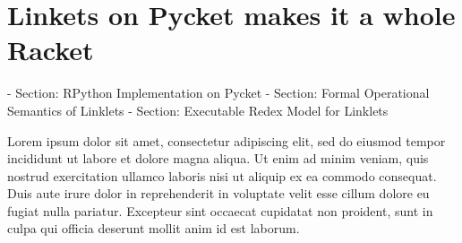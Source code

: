 \chapter{Linkets on Pycket makes it a whole Racket}
	- Section: RPython Implementation on Pycket
	- Section: Formal Operational Semantics of Linklets
	- Section: Executable Redex Model for Linklets
	
Lorem ipsum dolor sit amet, consectetur adipiscing elit, sed do eiusmod tempor incididunt ut labore et dolore magna aliqua. Ut enim ad minim veniam, quis nostrud exercitation ullamco laboris nisi ut aliquip ex ea commodo consequat. Duis aute irure dolor in reprehenderit in voluptate velit esse cillum dolore eu fugiat nulla pariatur. Excepteur sint occaecat cupidatat non proident, sunt in culpa qui officia deserunt mollit anim id est laborum.
